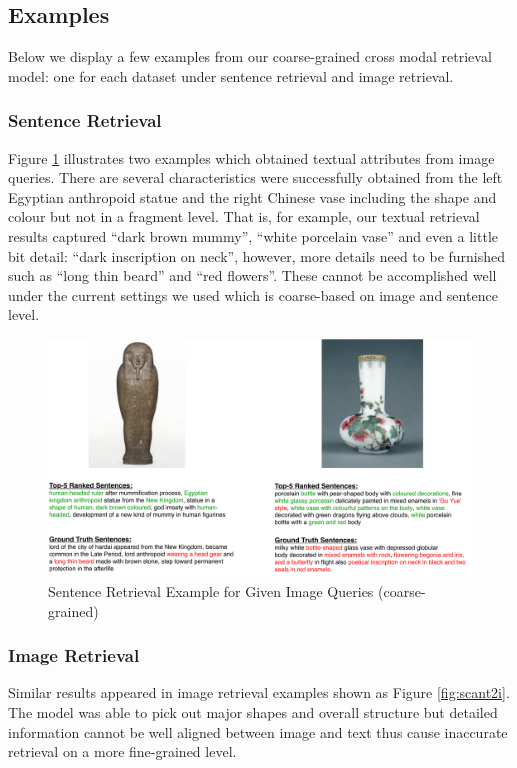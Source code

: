 \subsection{Examples}
Below we display a few examples from our coarse-grained cross modal retrieval model: one for each dataset under sentence retrieval and image retrieval.

\subsubsection{Sentence Retrieval}
Figure \ref{fig:scani2t} illustrates two examples which obtained textual attributes from image queries. There are several characteristics were successfully obtained from the left Egyptian anthropoid statue and the right Chinese vase including the shape and colour but not in a fragment level. That is, for example, our textual retrieval results captured ``dark brown mummy'', ``white porcelain vase'' and even a little bit detail: ``dark inscription on neck'', however, more details need to be furnished such as ``long thin beard'' and ``red flowers''. These cannot be accomplished well under the current settings we used which is coarse-based on image and sentence level.

\begin{figure}[h!]
\centering
\includegraphics[width=\textwidth]{scani2t.pdf}
\caption{Sentence Retrieval Example for Given Image Queries (coarse-grained)}
\label{fig:scani2t}
\end{figure}

\subsubsection{Image Retrieval}
Similar results appeared in image retrieval examples shown as Figure \ref{fig:scant2i}. The model was able to pick out major shapes and overall structure but detailed information cannot be well aligned between image and text thus cause inaccurate retrieval on a more fine-grained level.

